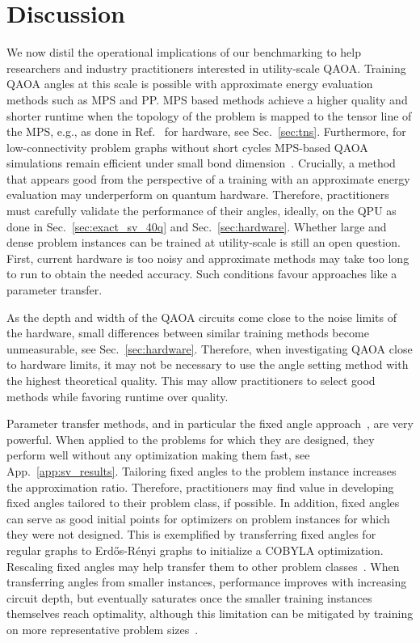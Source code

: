 \documentclass[twocolumn,
english,
aps,
pra,
10pt,
longbibliography,
superscriptaddress,
amsmath,
amssymb,
floatfix
]{revtex4-2}
\begin{document}
{\section{Discussion\label{sec:best}}

We now distil the operational implications of our benchmarking to help researchers and industry practitioners interested in utility-scale QAOA.
Training QAOA angles at this scale is possible with approximate energy evaluation methods such as MPS and PP.
MPS based methods achieve a higher quality and shorter runtime when the topology of the problem is mapped to the tensor line of the MPS, e.g., as done in Ref.~\cite{Matsuo2023} for hardware, see Sec.~\ref{sec:tns}. 
Furthermore, for low-connectivity problem graphs without short cycles MPS-based QAOA simulations remain efficient under small bond dimension~\cite{Watanabe2026}.
Crucially, a method that appears good from the perspective of a training with an approximate energy evaluation may underperform on quantum hardware.
Therefore, practitioners must carefully validate the performance of their angles, ideally, on the QPU as done in Sec.~\ref{sec:exact_sv_40q} and Sec.~\ref{sec:hardware}.
Whether large and dense problem instances can be trained at utility-scale is still an open question. First, current hardware is too noisy and approximate methods may take too long to run to obtain the needed accuracy.
Such conditions favour approaches like a parameter transfer.

As the depth and width of the QAOA circuits come close to the noise limits of the hardware, small differences between similar training methods become unmeasurable, see Sec.~\ref{sec:hardware}.
Therefore, when investigating QAOA close to hardware limits, it may not be necessary to use the angle setting method with the highest theoretical quality.
This may allow practitioners to select good methods while favoring runtime over quality.

Parameter transfer methods, and in particular the fixed angle approach~\cite{Wurtz2021}, are very powerful.
When applied to the problems for which they are designed, they perform well without any optimization making them fast, see App.~\ref{app:sv_results}.
Tailoring fixed angles to the problem instance increases the approximation ratio.
Therefore, practitioners may find value in developing fixed angles tailored to their problem class, if possible.
In addition, fixed angles can serve as good initial points for optimizers on problem instances for which they were not designed. 
This is exemplified by transferring fixed angles for regular graphs to Erd\H{o}s-R\'{e}nyi graphs to initialize a COBYLA optimization.
Rescaling fixed angles may help transfer them to other problem classes~\cite{Sureshbabu2024}. 
When transferring angles from smaller instances, performance improves with increasing circuit depth, but eventually saturates once the smaller training instances themselves reach optimality, although this limitation can be mitigated by training on more representative problem sizes~\cite{Watanabe2026}.

}
\end{document}
